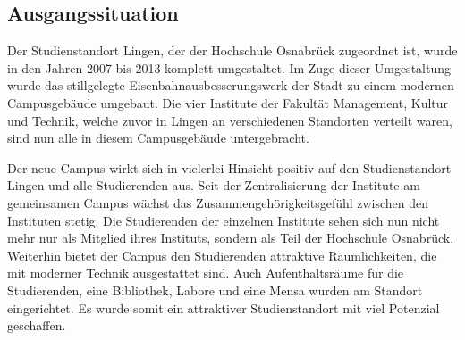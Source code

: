 \subsection{Ausgangssituation}
\label{sec:Ausgangssituation}

Der Studienstandort Lingen, der der Hochschule Osnabrück zugeordnet ist, wurde
in den Jahren 2007 bis 2013 komplett umgestaltet. Im Zuge dieser Umgestaltung
wurde das stillgelegte Eisenbahnausbesserungswerk der Stadt zu einem modernen
Campusgebäude umgebaut. Die vier Institute der Fakultät Management, Kultur und
Technik, welche zuvor in Lingen an verschiedenen Standorten verteilt
waren, sind nun alle in diesem Campusgebäude untergebracht.

Der neue Campus wirkt sich in vielerlei Hinsicht positiv auf den
Studienstandort Lingen und alle Studierenden aus. Seit der Zentralisierung der
Institute am gemeinsamen Campus wächst das Zusammengehörigkeitsgefühl zwischen
den Instituten stetig. Die Studierenden der einzelnen Institute sehen sich nun
nicht mehr nur als Mitglied ihres Instituts, sondern als Teil der Hochschule
Osnabrück. Weiterhin bietet der Campus den Studierenden attraktive
Räumlichkeiten, die mit moderner Technik ausgestattet sind. Auch
Aufenthaltsräume für die Studierenden, eine Bibliothek, Labore und eine Mensa
wurden am Standort eingerichtet. Es wurde somit ein attraktiver Studienstandort
mit viel Potenzial geschaffen.